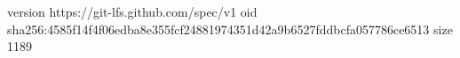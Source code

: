 version https://git-lfs.github.com/spec/v1
oid sha256:4585f14f4f06edba8e355fcf24881974351d42a9b6527fddbcfa057786ce6513
size 1189
